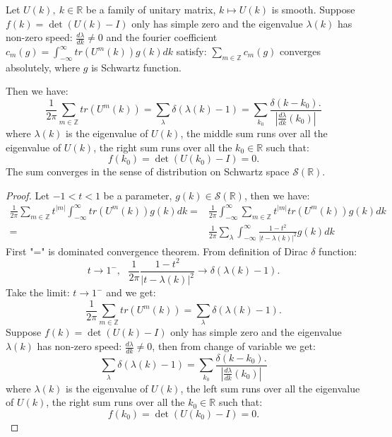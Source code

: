 \documentclass[10pt,a4paper]{amsart}
\newcommand{\R}{\mathbb{R}}
\newcommand{\Z}{\mathbb{Z}}
\begin{document}
\begin{thm}
	Let $U\left(k\right),\ k\in\R$ be a family of unitary matrix, $k \mapsto U\left(k\right)$ is smooth. Suppose $f\left(k\right)=\det\left(U\left(k\right)-I\right)$ only has simple zero and the eigenvalue $\lambda\left(k\right)$ has non-zero speed: $\frac{d\lambda}{dk}\neq 0$ and the fourier coefficient $c_m\left(g\right) =\int_{-\infty}^{\infty}tr\left( U^m\left(k\right)\right)g\left(k\right)dk$ satisfy: $\sum_{m\in \Z}c_m\left(g\right)$ converges absolutely, where $g$ is Schwartz function.
	
	Then we have:
	$$
	\frac{1}{2\pi}\sum_{m\in \Z}tr\left( U^m\left(k\right)\right)  =\sum_{\lambda}\delta\left(\lambda\left(k\right) -1\right)=\sum_{k_0}\frac{\delta\left(k-k_0\right).}{\left|\frac{d\lambda}{dk}(k_0)\right| }
	$$
	where $\lambda\left(k\right)$ is the eigenvalue of $U\left(k\right)$, the middle sum runs over all the eigenvalue of $U\left(k\right)$, the right sum runs over all the $k_0\in \R$ such that:
	$$f\left(k_0\right)=\det\left(U\left(k_0\right)-I\right)=0.$$
	The sum converges in the sense of distribution on Schwartz space $\mathcal{S}\left(\R\right) $.
\end{thm}

\begin{proof}
	Let $-1<t<1$ be a parameter, $g\left(k\right)\in \mathcal{S}\left(\R\right)$, then we have:
	\begin{align*}
	 \frac{1}{2\pi}\sum_{m\in \Z}t^{\left|m\right| }\int_{-\infty}^{\infty}tr\left(U^m\left(k\right)\right)g\left (k\right )dk=& 	\frac{1}{2\pi}\int_{-\infty}^{\infty}\sum_{m\in \Z}t^{\left|m\right| }tr\left(U^m\left(k\right)\right)g\left (k\right )dk \\
	 =&\frac{1}{2\pi}\sum_{\lambda}\int_{-\infty}^{\infty}\frac{1-t^2}{\left | t-\lambda\left (k\right )  \right |^2 } g\left (k\right )dk
	\end{align*}
	First "=" is dominated convergence theorem. From definition of Dirac $\delta$ function:
	$$
	t\to 1^{-},\ \ \ \frac{1}{2\pi}\frac{1-t^2}{\left | t-\lambda\left (k\right )  \right |^2} \to \delta\left(\lambda\left(k\right) -1\right).
	$$
	Take the limit: $t\to 1^{-}$ and we get:
	$$
	\frac{1}{2\pi}\sum_{m\in \Z}tr\left( U^m\left(k\right)\right)  =\sum_{\lambda}\delta\left(\lambda\left(k\right) -1\right).
	$$
	Suppose $f\left(k\right)=\det\left(U\left(k\right)-I\right)$ only has simple zero and the eigenvalue $\lambda\left(k\right)$ has non-zero speed: $\frac{d\lambda}{dk}\neq 0$, then from change of variable we get:
	$$
	\sum_{\lambda}\delta\left(\lambda\left(k\right) -1\right)=\sum_{k_0}\frac{\delta\left(k-k_0\right).}{\left|\frac{d\lambda}{dk}(k_0)\right| }
	$$
	where $\lambda\left(k\right)$ is the eigenvalue of $U\left(k\right)$, the left sum runs over all the eigenvalue of $U\left(k\right)$, the right sum runs over all the $k_0\in \R$ such that:
    $$f\left(k_0\right)=\det\left(U\left(k_0\right)-I\right)=0.$$
\end{proof}
\end{document}
